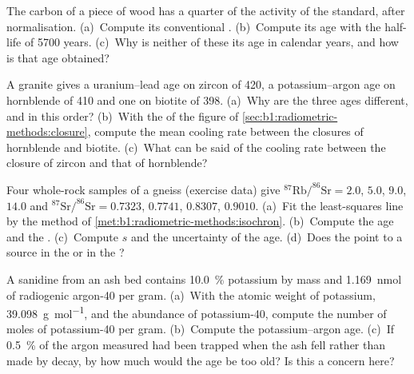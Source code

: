 \begin{exercise}[$\star$]\label{exo:b1:radiometric-methods:3}
The carbon of a piece of wood has a quarter of the activity of the standard,
after normalisation. (a)~Compute its conventional . (b)~Compute
its age with the half-life of \num{5700} years. (c)~Why is neither of these its
age in calendar years, and how is that age obtained?
\end{exercise}

\begin{exercise}[$\star$]\label{exo:b1:radiometric-methods:4}
A granite gives a uranium--lead age on zircon of \qty{420}{\Ma}, a
potassium--argon age on hornblende of \qty{410}{\Ma} and one on biotite of
\qty{398}{\Ma}. (a)~Why are the three ages different, and in this order?
(b)~With the  of the figure of
\cref{sec:b1:radiometric-methods:closure}, compute the mean cooling rate between
the closures of hornblende and biotite. (c)~What can be said of the cooling rate
between the closure of zircon and that of hornblende?
\end{exercise}

\begin{exercise}[$\star\star$]\label{exo:b1:radiometric-methods:5}
Four whole-rock samples of a gneiss (exercise data) give
$^{87}\mathrm{Rb}/^{86}\mathrm{Sr} = 2.0$, $5.0$, $9.0$, $14.0$ and
$^{87}\mathrm{Sr}/^{86}\mathrm{Sr} = 0.7323$, $0.7741$, $0.8307$, $0.9010$.
(a)~Fit the least-squares line by the method of
\cref{met:b1:radiometric-methods:isochron}. (b)~Compute the age and the . (c)~Compute $s$ and the uncertainty of the age. (d)~Does the 
point to a source in the  or in the ?
\end{exercise}

\begin{exercise}[$\star\star$]\label{exo:b1:radiometric-methods:6}
A sanidine from an ash bed contains \qty{10.0}{\percent} potassium by mass and
\qty{1.169}{nmol} of radiogenic argon-40 per gram. (a)~With the atomic weight of
potassium, \qty{39.098}{g.mol^{-1}}, and the abundance of potassium-40, compute
the number of moles of potassium-40 per gram. (b)~Compute the potassium--argon
age. (c)~If \qty{0.5}{\percent} of the argon measured had been trapped when the
ash fell rather than made by decay, by how much would the age be too old? Is this
a concern here?
\end{exercise}

